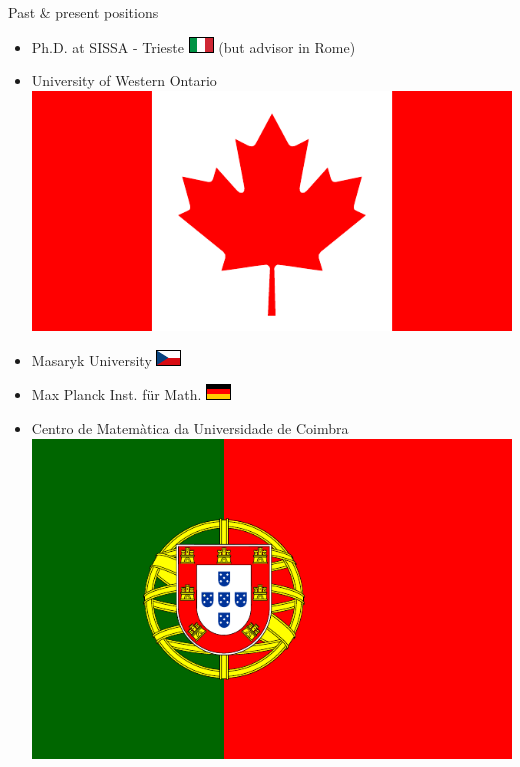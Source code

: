 \documentclass{beamer}
\author{Fosco Loregian \darkLogo}
\title{}
\date{}
\begin{document}
\begin{frame}
  \maketitle
\end{frame}
\begin{frame}{Past \& present positions}
  \begin{itemize}
    \item<+-> Ph.D. at SISSA - Trieste \includegraphics{ita.pdf} (but advisor in Rome)

    \item<+-> University of Western Ontario \includegraphics[scale=.04]{can.pdf}

    \item<+-> Masaryk University \includegraphics{czr.pdf}

    \item<+-> Max Planck Inst. für Math. \includegraphics{ger.pdf}

    \item<+-> Centro de Matemàtica da Universidade de Coimbra \includegraphics[scale=.04]{por.pdf}


\end{itemize}
\end{frame}
\end{document}
